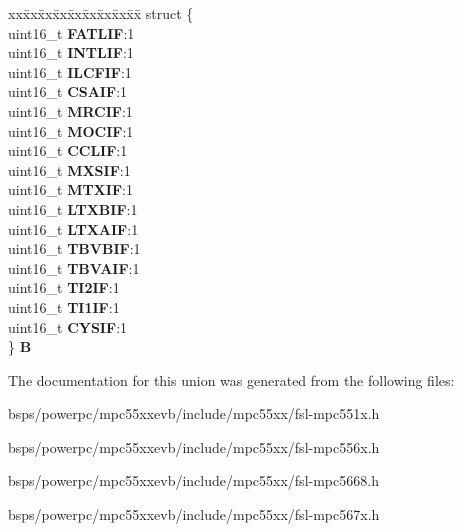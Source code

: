\begin{DoxyCompactItemize}
\begin{tabbing}
\end{tabbing}\item 
\mbox{\label{unionuPIFR0_ab55fbe516ad06dd30e51d1c86d3f8506}} 
\begin{tabbing}
xx\=xx\=xx\=xx\=xx\=xx\=xx\=xx\=xx\=\kill
struct \{\\
\>uint16\_t {\bfseries FATLIF}:1\\
\>uint16\_t {\bfseries INTLIF}:1\\
\>uint16\_t {\bfseries ILCFIF}:1\\
\>uint16\_t {\bfseries CSAIF}:1\\
\>uint16\_t {\bfseries MRCIF}:1\\
\>uint16\_t {\bfseries MOCIF}:1\\
\>uint16\_t {\bfseries CCLIF}:1\\
\>uint16\_t {\bfseries MXSIF}:1\\
\>uint16\_t {\bfseries MTXIF}:1\\
\>uint16\_t {\bfseries LTXBIF}:1\\
\>uint16\_t {\bfseries LTXAIF}:1\\
\>uint16\_t {\bfseries TBVBIF}:1\\
\>uint16\_t {\bfseries TBVAIF}:1\\
\>uint16\_t {\bfseries TI2IF}:1\\
\>uint16\_t {\bfseries TI1IF}:1\\
\>uint16\_t {\bfseries CYSIF}:1\\
\} {\bfseries B}\\

\end{tabbing}\end{DoxyCompactItemize}


The documentation for this union was generated from the following files\+:\begin{DoxyCompactItemize}
\item 
bsps/powerpc/mpc55xxevb/include/mpc55xx/fsl-\/mpc551x.\+h\item 
bsps/powerpc/mpc55xxevb/include/mpc55xx/fsl-\/mpc556x.\+h\item 
bsps/powerpc/mpc55xxevb/include/mpc55xx/fsl-\/mpc5668.\+h\item 
bsps/powerpc/mpc55xxevb/include/mpc55xx/fsl-\/mpc567x.\+h\end{DoxyCompactItemize}
